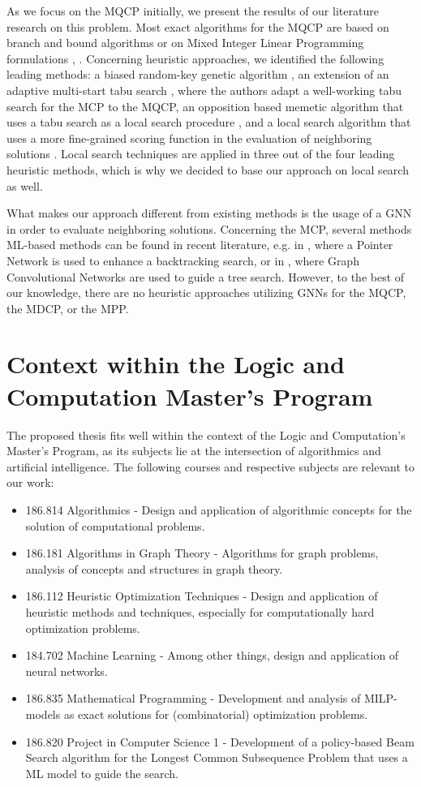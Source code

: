 \documentclass [11pt]{article}
\begin{document}
As we focus on the MQCP initially, we present the results of our literature research on this problem. Most exact algorithms for the MQCP are based on branch and bound algorithms \cite{mahdavi2014branch} or on Mixed Integer Linear Programming formulations \cite{ribeiro_exact_2019}, \cite{Marinelli2021}. Concerning heuristic approaches, we identified the following leading methods: a biased random-key genetic algorithm \cite{pinto_biased_2018}, an extension of an adaptive multi-start tabu search \cite{djeddi_extension_2019}, where the authors adapt a well-working tabu search for the MCP to the MQCP, an opposition based memetic algorithm that uses a tabu search as a local search procedure \cite{zhou_opposition-based_2020}, and a local search algorithm that uses a more fine-grained scoring function in the evaluation of neighboring solutions \cite{chen_nuqclq_2021}. Local search techniques are applied in three out of the four leading heuristic methods, which is why we decided to base our approach on local search as well.  

What makes our approach different from existing methods is the usage of a GNN in order to evaluate neighboring solutions. Concerning the MCP, several methods ML-based methods can be found in recent literature, e.g. in \cite{Gu2020}, where a Pointer Network is used to enhance a backtracking search, or in \cite{Li2018}, where Graph Convolutional Networks are used to guide a tree search. However, to the best of our knowledge, there are no heuristic approaches utilizing GNNs for the MQCP, the MDCP, or the MPP. 

\section{Context within the Logic and Computation Master's Program}

The proposed thesis fits well within the context of the Logic and Computation's Master's Program, as its subjects lie at the intersection of algorithmics and artificial intelligence. The following courses and respective subjects are relevant to our work:
\begin{itemize}
	\item 186.814 Algorithmics - Design and application of algorithmic concepts for the solution of computational problems. 
	\item 186.181 Algorithms in Graph Theory - Algorithms for graph problems, analysis of concepts and structures in graph theory.
	\item 186.112 Heuristic Optimization Techniques - Design and application of heuristic methods and techniques, especially for computationally hard optimization problems.
	\item 184.702 Machine Learning - Among other things, design and application of neural networks.
	\item 186.835 Mathematical Programming - Development and analysis of MILP-models as exact solutions for (combinatorial) optimization problems.
	\item 186.820 Project in Computer Science 1 - Development of a policy-based Beam Search algorithm for the Longest Common Subsequence Problem that uses a ML model to guide the search. 
\end{itemize}

 

\end{document}
